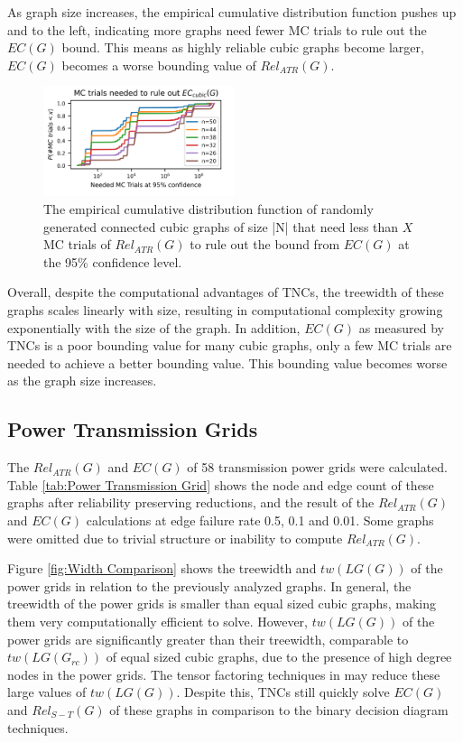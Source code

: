 \documentclass[12pt,twocolumn]{article}
\begin{document}
As graph size increases, the empirical cumulative distribution function pushes up and to the left, indicating more graphs need fewer MC trials to rule out the \(EC(G)\) bound. This means as highly reliable cubic graphs become larger, \(EC(G)\) becomes a worse bounding value of \(Rel_{ATR}(G)\).

\begin{figure}[t]
\caption{The empirical cumulative distribution function of randomly generated connected cubic graphs of size |N| that need less than $X$ MC trials of $Rel_{ATR}(G)$ to rule out the bound from $EC(G)$ at the 95\% confidence level.}
\label{fig:Random Cubic MC}
\includegraphics[width=0.5\textwidth]{../figures/RcubicTrials.png}
\end{figure}

Overall, despite the computational advantages of TNCs, the treewidth of these graphs scales linearly with size, resulting in computational complexity growing exponentially with the size of the graph. In addition, \(EC(G)\) as measured by TNCs is a poor bounding value for many cubic graphs, only a few MC trials are needed to achieve a better bounding value. This bounding value becomes worse as the graph size increases.

\hypertarget{power-transmission-grids}{%
\subsection{Power Transmission Grids}\label{power-transmission-grids}}

The \(Rel_{ATR}(G)\) and \(EC(G)\) of 58 transmission power grids \cite{li2016characterizing} were calculated. Table \ref{tab:Power Transmission Grid} shows the node and edge count of these graphs after reliability preserving reductions, and the result of the \(Rel_{ATR}(G)\) and \(EC(G)\) calculations at edge failure rate 0.5, 0.1 and 0.01. Some graphs were omitted due to trivial structure or inability to compute \(Rel_{ATR}(G)\).

Figure \ref{fig:Width Comparison} shows the treewidth and \(tw(LG(G))\) of the power grids in relation to the previously analyzed graphs. In general, the treewidth of the power grids is smaller than equal sized cubic graphs, making them very computationally efficient to solve. However, \(tw(LG(G))\) of the power grids are significantly greater than their treewidth, comparable to \(tw(LG(G_{rc}))\) of equal sized cubic graphs, due to the presence of high degree nodes in the power grids. The tensor factoring techniques in \cite{dudek2019efficient} may reduce these large values of \(tw(LG(G))\). Despite this, TNCs still quickly solve \(EC(G)\) and \(Rel_{S-T}(G)\) of these graphs in comparison to the binary decision diagram techniques.
\end{document}
